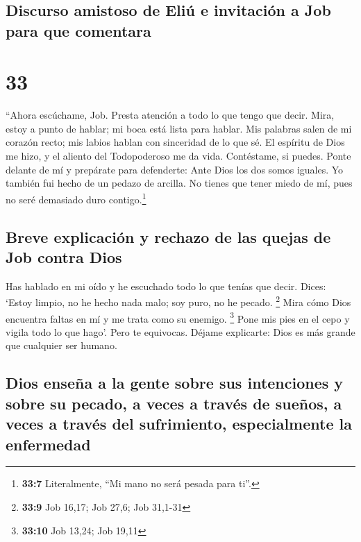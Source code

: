 \hypertarget{discurso-amistoso-de-eliuxfa-e-invitaciuxf3n-a-job-para-que-comentara}{%
\subsection{Discurso amistoso de Eliú e invitación a Job para que
comentara}\label{discurso-amistoso-de-eliuxfa-e-invitaciuxf3n-a-job-para-que-comentara}}

\hypertarget{section-32}{%
\section{33}\label{section-32}}

 ``Ahora escúchame, Job. Presta atención a todo lo que
tengo que decir.  Mira, estoy a punto de hablar; mi boca
está lista para hablar.  Mis palabras salen de mi corazón
recto; mis labios hablan con sinceridad de lo que sé.  El
espíritu de Dios me hizo, y el aliento del Todopoderoso me da vida.
 Contéstame, si puedes. Ponte delante de mí y prepárate
para defenderte:  Ante Dios los dos somos iguales. Yo
también fui hecho de un pedazo de arcilla.  No tienes que
tener miedo de mí, pues no seré demasiado duro contigo.\footnote{\textbf{33:7}
  Literalmente, ``Mi mano no será pesada para ti''.}

\hypertarget{breve-explicaciuxf3n-y-rechazo-de-las-quejas-de-job-contra-dios}{%
\subsection{Breve explicación y rechazo de las quejas de Job contra
Dios}\label{breve-explicaciuxf3n-y-rechazo-de-las-quejas-de-job-contra-dios}}

 Has hablado en mi oído y he escuchado todo lo que tenías
que decir.  Dices: `Estoy limpio, no he hecho nada malo;
soy puro, no he pecado. \footnote{\textbf{33:9} Job 16,17; Job 27,6; Job
  31,1-31}  Mira cómo Dios encuentra faltas en mí y me
trata como su enemigo. \footnote{\textbf{33:10} Job 13,24; Job 19,11}
 Pone mis pies en el cepo y vigila todo lo que hago'.
 Pero te equivocas. Déjame explicarte: Dios es más grande
que cualquier ser humano.

\hypertarget{dios-enseuxf1a-a-la-gente-sobre-sus-intenciones-y-sobre-su-pecado-a-veces-a-travuxe9s-de-sueuxf1os-a-veces-a-travuxe9s-del-sufrimiento-especialmente-la-enfermedad}{%
\subsection{Dios enseña a la gente sobre sus intenciones y sobre su
pecado, a veces a través de sueños, a veces a través del sufrimiento,
especialmente la
enfermedad}\label{dios-enseuxf1a-a-la-gente-sobre-sus-intenciones-y-sobre-su-pecado-a-veces-a-travuxe9s-de-sueuxf1os-a-veces-a-travuxe9s-del-sufrimiento-especialmente-la-enfermedad}}

